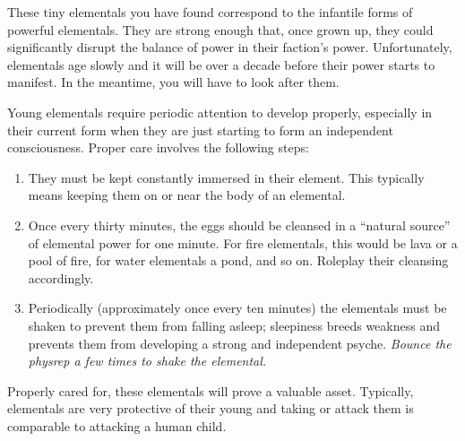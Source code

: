 \documentclass[green]{elementals}
\begin{document}
\name{\gElementalEggs{}}

These tiny elementals you have found correspond to the infantile forms of powerful elementals. They are strong enough that, once grown up, they could significantly disrupt the balance of power in their faction's power. Unfortunately, elementals age slowly and it will be over a decade before their power starts to manifest. In the meantime, you will have to look after them.

Young elementals require periodic attention to develop properly, especially in their current form when they are just starting to form an independent consciousness. Proper care involves the following steps:
\begin{enumerate}
  \item They must be kept constantly immersed in their element. This typically means keeping them on or near the body of an elemental.
  \item Once every thirty minutes, the eggs should be cleansed in a ``natural source'' of elemental power for one minute. For fire elementals, this would be lava or a pool of fire, for water elementals a pond, and so on. Roleplay their cleansing accordingly.
  \item Periodically (approximately once every ten minutes) the elementals must be shaken to prevent them from falling asleep; sleepiness breeds weakness and prevents them from developing a strong and independent psyche. \emph{Bounce the physrep a few times to shake the elemental.}
\end{enumerate}

Properly cared for, these elementals will prove a valuable asset. Typically, elementals are very protective of their young and taking or attack them is comparable to attacking a human child.
\end{document}
